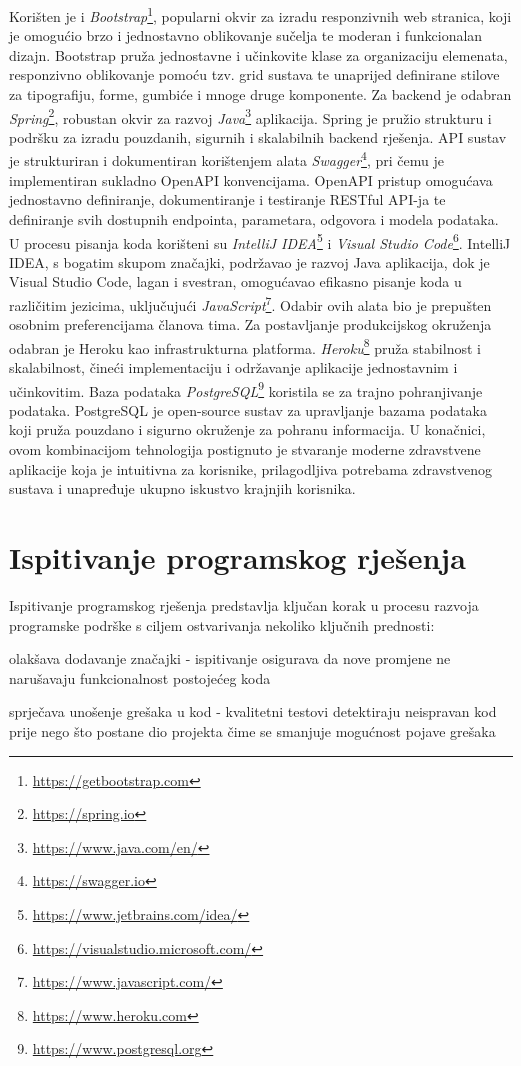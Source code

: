 			 Korišten je i \textit{Bootstrap}\footnote{\url{https://getbootstrap.com}}, popularni okvir za izradu responzivnih web stranica, koji je omogućio brzo i jednostavno oblikovanje sučelja te moderan i funkcionalan dizajn. Bootstrap pruža jednostavne i učinkovite klase za organizaciju elemenata, responzivno oblikovanje pomoću tzv. grid sustava te unaprijed definirane stilove za tipografiju, forme, gumbiće i mnoge druge komponente.
			 Za backend je odabran \textit{Spring}\footnote{\url{https://spring.io}}, robustan okvir za razvoj \textit{Java}\footnote{\url{https://www.java.com/en/}} aplikacija. Spring je pružio strukturu i podršku za izradu pouzdanih, sigurnih i skalabilnih backend rješenja.
			 API sustav je strukturiran i dokumentiran korištenjem alata \textit{Swagger}\footnote{\url{https://swagger.io}}, pri čemu je implementiran sukladno OpenAPI konvencijama. OpenAPI pristup omogućava jednostavno definiranje, dokumentiranje i testiranje RESTful API-ja te definiranje svih dostupnih endpointa, parametara, odgovora i modela podataka.
			 U procesu pisanja koda korišteni su \textit{IntelliJ IDEA}\footnote{\url{https://www.jetbrains.com/idea/}} i \textit{Visual Studio Code}\footnote{\url{https://visualstudio.microsoft.com/}}. IntelliJ IDEA, s bogatim skupom značajki, podržavao je razvoj Java aplikacija, dok je Visual Studio Code, lagan i svestran, omogućavao efikasno pisanje koda u različitim jezicima, uključujući \textit{JavaScript}\footnote{\url{https://www.javascript.com/}}.
			 Odabir ovih alata bio je prepušten osobnim preferencijama članova tima.
			 Za postavljanje produkcijskog okruženja odabran je Heroku kao infrastrukturna platforma. \textit{Heroku}\footnote{\url{https://www.heroku.com}} pruža stabilnost i skalabilnost, čineći implementaciju i održavanje aplikacije jednostavnim i učinkovitim.
			 Baza podataka \textit{PostgreSQL}\footnote{\url{https://www.postgresql.org}} koristila se za trajno pohranjivanje podataka. PostgreSQL je open-source sustav za upravljanje bazama podataka koji pruža pouzdano i sigurno okruženje za pohranu informacija.
			 U konačnici, ovom kombinacijom tehnologija postignuto je stvaranje moderne zdravstvene aplikacije koja je intuitivna za korisnike, prilagodljiva potrebama zdravstvenog sustava i unapređuje ukupno iskustvo krajnjih korisnika.
			\eject 
	
		\section{Ispitivanje programskog rješenja}
			Ispitivanje programskog rješenja predstavlja ključan korak u procesu razvoja programske podrške s ciljem ostvarivanja nekoliko ključnih prednosti:
			\begin{packed_item}
				\item olakšava dodavanje značajki - ispitivanje osigurava da nove promjene ne narušavaju funkcionalnost postojećeg koda
				\item sprječava unošenje grešaka u kod - kvalitetni testovi detektiraju neispravan kod prije nego što postane dio projekta čime se smanjuje mogućnost pojave grešaka
			\end{packed_item}
			
